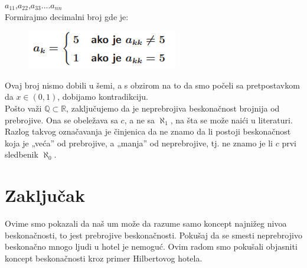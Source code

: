 \documentclass[a4paper]{article}
\begin{document}
$a_{11}$,$a_{22}$,$a_{33}$....$a_{nn}$\\

Formirajmo decimalni broj gde je:
\begin{figure}[ht!]
    \begin{center}
    \includegraphics[scale=1.30]{tnp2.png}
    \end{center}
    \end{figure}

Ovaj broj nismo dobili u šemi, a s obzirom na to da smo počeli sa pretpostavkom da $x \in (0,1)$, dobijamo kontradikciju.\\

Pošto važi $\mathbb{Q}\subset \mathbb{R}$, zaključujemo da je neprebrojiva beskonačnost brojnija od prebrojive. Ona se obeležava sa $c$, a ne sa $\aleph_{1}$, na šta se može naići u literaturi. Razlog takvog označavanja je činjenica da ne znamo da li postoji beskonačnost koja je „veća” od prebrojive, a „manja” od neprebrojive, tj. ne znamo je li $c$ prvi sledbenik $\aleph_{0}$.\\

\section{Zaključak}
\label{poglavlje:Zaključak}
Ovime smo pokazali da naš um može da razume samo koncept najnižeg nivoa beskonačnosti, to jest prebrojive beskonačnosti.
Pokušaj da se smesti neprebrojivo beskonačno mnogo ljudi u hotel je nemoguć. Ovim radom smo pokušali objasniti koncept beskonačnosti kroz primer Hilbertovog hotela.


% 
%



\end{document}
